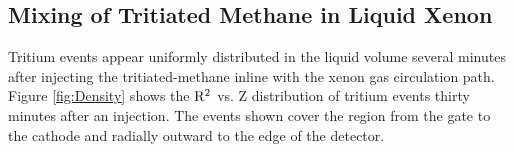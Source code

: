 \subsection{Mixing of Tritiated Methane in Liquid Xenon}

Tritium events appear uniformly distributed in the liquid volume several minutes after injecting the tritiated-methane inline with the xenon gas circulation path. Figure \ref{fig:Density} shows the $\rm R^2$ vs. Z distribution of tritium events thirty minutes after an injection. The events shown cover the region from the gate to the cathode and radially outward to the edge of the detector. %
 
